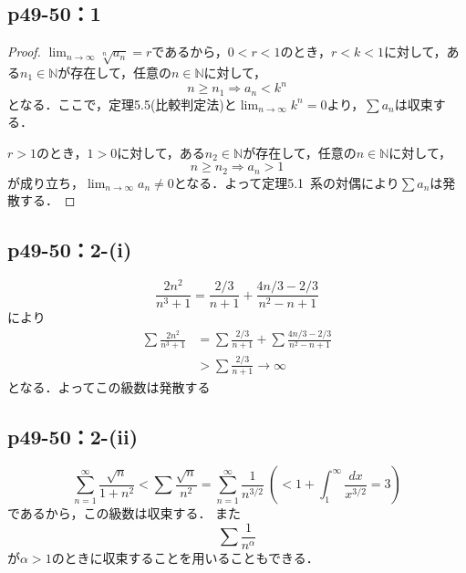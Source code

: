\documentclass[uplatex,dvipdfmx,a4paper,10pt,fleqn]{jsarticle}
\begin{document}
\newpage 


    \subsection*{p49-50：1}

\begin{tleftbar}
	\begin{proof}
		$\lim_{n \to \infty} \sqrt[n]{a_n} =r$であるから，$0<r<1$のとき，$r<k<1$に対して，ある$n_1 \in \mathbb{N}$が存在して，任意の$n \in \mathbb{N}$に対して，
		\[
			n \ge n_1 \Longrightarrow a_n<k^n
		\]
		となる．ここで，定理5.5(比較判定法)と$\lim_{n \to \infty} k^n =0$より，$\sum a_n$は収束する．

		$r>1$のとき，$1>0$に対して，ある$n_2 \in \mathbb{N}$が存在して，任意の$n \in \mathbb{N}$に対して，
		\[
			n \ge n_2 \Longrightarrow a_n >1
		\]
		が成り立ち，$\lim_{n \to \infty} a_n \ne 0$となる．よって定理5.1~系の対偶により$\sum a_n$は発散する．
	\end{proof}
\end{tleftbar}

\subsection*{p49-50：2-(i)}

\begin{screen}
	\[
	\frac{2n^2}{n^3+1}=\frac{2/3}{n+1}+\frac{4n/3-2/3}{n^2-n+1}
	\]
	により
	\begin{align*}
	\sum \frac{2n^2}{n^3+1}&=\sum \frac{2/3}{n+1}+\sum \frac{4n/3-2/3}{n^2-n+1} \\
	&>\sum \frac{2/3}{n+1} \rightarrow \infty
	\end{align*}
	となる．よってこの級数は発散する
	\end{screen}
	

    \subsection*{p49-50：2-(ii)}

	\begin{screen}
	\[
	\sum ^{\infty}_{n=1}\frac{\sqrt{n}}{1+n^2}<\sum \frac{\sqrt{n}}{n^2}=\sum^{\infty}_{n=1}\frac{1}{n^{3/2}}~\left(<1+\int^{\infty}_{1}\frac{dx}{x^{3/2}}=3\right)
	\]
    であるから，この級数は収束する．
	また
	\[
	\sum \frac{1}{n^\alpha}
	\]
	が$\alpha >1$のときに収束することを用いることもできる．
	\end{screen}
\end{document}
